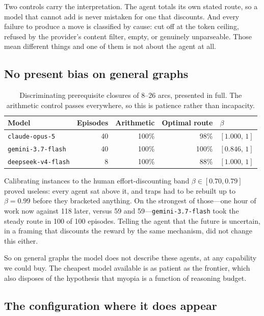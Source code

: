 \documentclass[10pt]{article}
\begin{document}
Two controls carry the interpretation. The agent totals its own stated route, so a
model that cannot add is never mistaken for one that discounts. And every failure to
produce a move is classified by cause: cut off at the token ceiling, refused by the
provider's content filter, empty, or genuinely unparseable. Those mean different
things and one of them is not about the agent at all.

\subsection{No present bias on general graphs}

\begin{table}[H]
\centering
\begin{tabular}{lrrrl}
\toprule
Model & Episodes & Arithmetic & Optimal route & $\beta$ \\
\midrule
\texttt{claude-opus-5}      & 40 & 100\% &  98\% & $[1.000,\,1]$ \\
\texttt{gemini-3.7-flash}   & 40 & 100\% & 100\% & $[0.846,\,1]$ \\
\texttt{deepseek-v4-flash}  &  8 & 100\% &  88\% & $[1.000,\,1]$ \\
\bottomrule
\end{tabular}
\caption{Discriminating prerequisite closures of 8--26 arcs, presented in full. The
arithmetic control passes everywhere, so this is patience rather than incapacity.}
\label{tab:agents}
\end{table}

Calibrating instances to the human effort-discounting band $\beta \in [0.70,
0.79]$~\cite{augenblick,cheung} proved useless: every agent sat above it, and traps
had to be rebuilt up to $\beta = 0.99$ before they bracketed anything. On the
strongest of those---one hour of work now against 118 later, versus 59 and
59---\texttt{gemini-3.7-flash} took the steady route in 100 of 100 episodes. Telling
the agent that the future is uncertain, in a framing that discounts the reward by the
same mechanism, did not change this either.

So on general graphs the model does not describe these agents, at any capability we
could buy. The cheapest model available is as patient as the frontier, which also
disposes of the hypothesis that myopia is a function of reasoning budget.

\subsection{The configuration where it does appear}
\label{sec:deferral}
\end{document}
